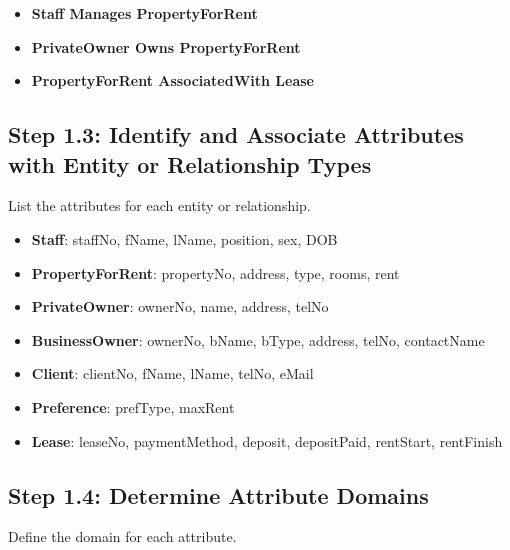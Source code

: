 \documentclass[a4paper,12pt]{article}
\begin{document}
\begin{itemize}
    \item \textbf{Staff Manages PropertyForRent}
    \item \textbf{PrivateOwner Owns PropertyForRent}
    \item \textbf{PropertyForRent AssociatedWith Lease}
\end{itemize}

\subsection*{Step 1.3: Identify and Associate Attributes with Entity or Relationship Types}
List the attributes for each entity or relationship.

\begin{itemize}
    \item \textbf{Staff}: staffNo, fName, lName, position, sex, DOB
    \item \textbf{PropertyForRent}: propertyNo, address, type, rooms, rent
    \item \textbf{PrivateOwner}: ownerNo, name, address, telNo
    \item \textbf{BusinessOwner}: ownerNo, bName, bType, address, telNo, contactName
    \item \textbf{Client}: clientNo, fName, lName, telNo, eMail
    \item \textbf{Preference}: prefType, maxRent
    \item \textbf{Lease}: leaseNo, paymentMethod, deposit, depositPaid, rentStart, rentFinish
\end{itemize}

\subsection*{Step 1.4: Determine Attribute Domains}
Define the domain for each attribute.
\end{document}
